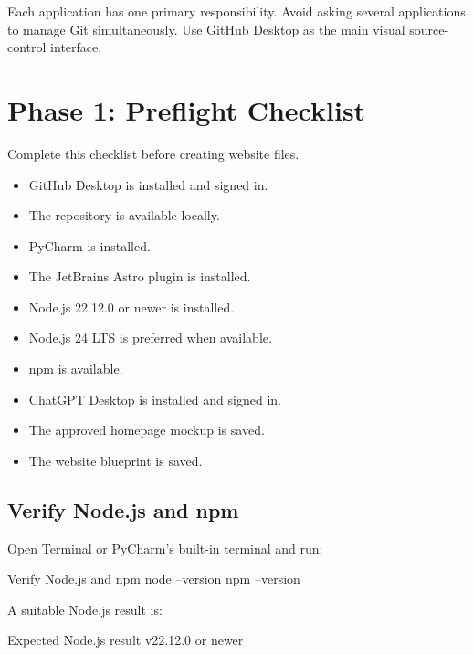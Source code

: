 \documentclass[11pt,letterpaper]{article}
\newcommand{\checkbox}{\(\square\)}
\begin{document}
\begin{checkpointbox}
Each application has one primary responsibility. Avoid asking several
applications to manage Git simultaneously. Use GitHub Desktop as the
main visual source-control interface.
\end{checkpointbox}

\section{Phase 1: Preflight Checklist}

Complete this checklist before creating website files.

\begin{itemize}
    \item[\checkbox] GitHub Desktop is installed and signed in.
    \item[\checkbox] The repository is available locally.
    \item[\checkbox] PyCharm is installed.
    \item[\checkbox] The JetBrains Astro plugin is installed.
    \item[\checkbox] Node.js 22.12.0 or newer is installed.
    \item[\checkbox] Node.js 24 LTS is preferred when available.
    \item[\checkbox] npm is available.
    \item[\checkbox] ChatGPT Desktop is installed and signed in.
    \item[\checkbox] The approved homepage mockup is saved.
    \item[\checkbox] The website blueprint is saved.
\end{itemize}

\subsection{Verify Node.js and npm}

Open Terminal or PyCharm's built-in terminal and run:

\begin{commandbox}{Verify Node.js and npm}
node --version
npm --version
\end{commandbox}

A suitable Node.js result is:

\begin{codebox}{Expected Node.js result}
v22.12.0 or newer
\end{codebox}
\end{document}
